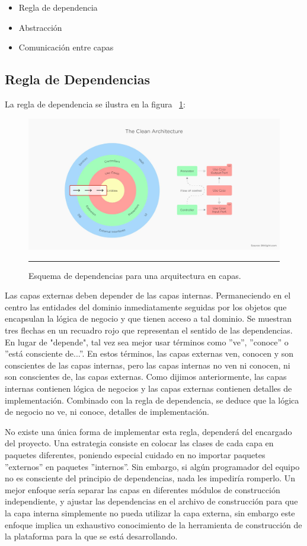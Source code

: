 \begin{itemize}
	\item Regla de dependencia
	\item Abstracción
	\item Comunicación entre capas
\end{itemize}

\subsection{Regla de Dependencias}
La regla de dependencia se ilustra en la figura ~\ref{fig:Diagrama_clasico}:

\begin{figure}[htbp]
	\centering
	\includegraphics[width=1\textwidth]{Figures/-001.png}
	\rule{35em}{1pt}
	\caption[Principio de Dependecias]{Esquema de dependencias para una arquitectura en capas.}
	\label{fig:Diagrama_clasico}
\end{figure}


Las capas externas deben depender de las capas internas. Permaneciendo en el centro las entidades del dominio inmediatamente seguidas por los objetos que encapsulan la lógica de negocio y que tienen acceso a tal dominio.  Se muestran tres flechas en un recuadro rojo que representan el sentido de las dependencias. En lugar de "depende", tal vez sea mejor usar términos como ''ve'', ''conoce'' o ''está consciente de...''. En estos términos, las capas externas ven, conocen y son conscientes de las capas internas, pero las capas internas no ven ni conocen, ni son conscientes de, las capas externas. Como dijimos anteriormente, las capas internas contienen lógica de negocios y las capas externas contienen detalles de implementación. Combinado con la regla de dependencia, se deduce que la lógica de negocio no ve, ni conoce, detalles de implementación.

No existe una única forma de implementar esta regla, dependerá del encargado del proyecto. Una estrategia consiste en colocar las clases de cada capa en paquetes diferentes, poniendo especial cuidado en no importar paquetes ''externos'' en paquetes ''internos''. Sin embargo, si algún programador del equipo no es consciente del principio de dependencias, nada les impediría romperlo. Un mejor enfoque sería separar las capas en diferentes módulos de construcción independiente, y ajustar las dependencias en el archivo de construcción para que la capa interna simplemente no pueda utilizar la capa externa, sin embargo este enfoque implica un exhaustivo conocimiento de la herramienta de construcción de la plataforma para la que se está desarrollando.

